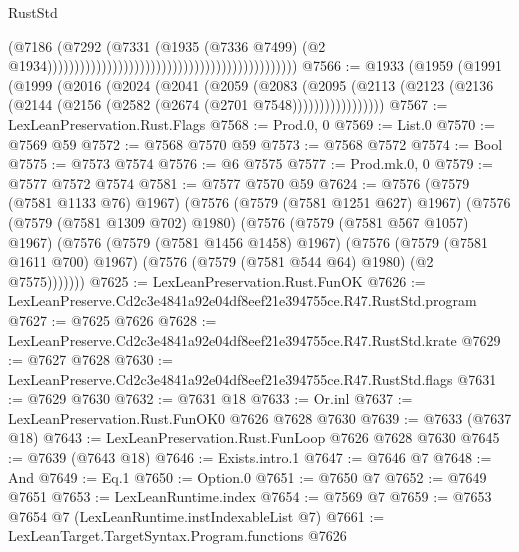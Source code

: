 \begin{lexlean}{RustStd}
\begin{coremodule}
                                                                                      (@7186
                                                                                        (@7292
                                                                                          (@7331
                                                                                            (@1935
                                                                                              (@7336
                                                                                                @7499)
                                                                                              (@2
                                                                                                @1934))))))))))))))))))))))))))))))))))))))))))))))
@7566 := @1933
    (@1959
      (@1991
        (@1999
          (@2016
            (@2024
              (@2041
                (@2059
                  (@2083
                    (@2095
                      (@2113 (@2123 (@2136 (@2144 (@2156 (@2582 (@2674 (@2701 @7548)))))))))))))))))
@7567 := LexLeanPreservation.Rust.Flags
@7568 := Prod.{0, 0}
@7569 := List.{0}
@7570 := @7569 @59
@7572 := @7568 @7570 @59
@7573 := @7568 @7572
@7574 := Bool
@7575 := @7573 @7574
@7576 := @6 @7575
@7577 := Prod.mk.{0, 0}
@7579 := @7577 @7572 @7574
@7581 := @7577 @7570 @59
@7624 := @7576
    (@7579 (@7581 @1133 @76) @1967)
    (@7576
      (@7579 (@7581 @1251 @627) @1967)
      (@7576
        (@7579 (@7581 @1309 @702) @1980)
        (@7576
          (@7579 (@7581 @567 @1057) @1967)
          (@7576
            (@7579 (@7581 @1456 @1458) @1967)
            (@7576
              (@7579 (@7581 @1611 @700) @1967)
              (@7576 (@7579 (@7581 @544 @64) @1980) (@2 @7575)))))))
@7625 := LexLeanPreservation.Rust.FunOK
@7626 := LexLeanPreserve.Cd2c3e4841a92e04df8eef21e394755ce.R47.RustStd.program
@7627 := @7625 @7626
@7628 := LexLeanPreserve.Cd2c3e4841a92e04df8eef21e394755ce.R47.RustStd.krate
@7629 := @7627 @7628
@7630 := LexLeanPreserve.Cd2c3e4841a92e04df8eef21e394755ce.R47.RustStd.flags
@7631 := @7629 @7630
@7632 := @7631 @18
@7633 := Or.inl
@7637 := LexLeanPreservation.Rust.FunOK0 @7626 @7628 @7630
@7639 := @7633 (@7637 @18)
@7643 := LexLeanPreservation.Rust.FunLoop @7626 @7628 @7630
@7645 := @7639 (@7643 @18)
@7646 := Exists.intro.{1}
@7647 := @7646 @7
@7648 := And
@7649 := Eq.{1}
@7650 := Option.{0}
@7651 := @7650 @7
@7652 := @7649 @7651
@7653 := LexLeanRuntime.index
@7654 := @7569 @7
@7659 := @7653 @7654 @7 (LexLeanRuntime.instIndexableList @7)
@7661 := LexLeanTarget.TargetSyntax.Program.functions @7626

\end{coremodule}
\end{lexlean}
